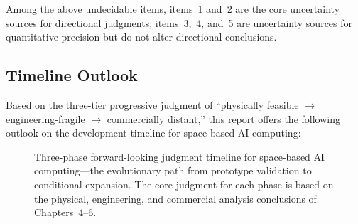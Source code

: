 Among the above undecidable items, items~1 and~2 are the core uncertainty sources for directional judgments; items~3,~4, and~5 are uncertainty sources for quantitative precision but do not alter directional conclusions.

\subsection{Timeline Outlook}

Based on the three-tier progressive judgment of ``physically feasible $\to$ engineering-fragile $\to$ commercially distant,'' this report offers the following outlook on the development timeline for space-based AI computing:

\begin{figure}[H]
\centering

\caption{Three-phase forward-looking judgment timeline for space-based AI computing---the evolutionary path from prototype validation to conditional expansion. The core judgment for each phase is based on the physical, engineering, and commercial analysis conclusions of Chapters~4--6.}
\label{fig:timeline_outlook}
\end{figure}

